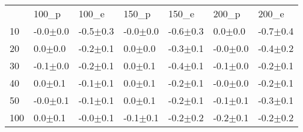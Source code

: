 \begin{tabular}{lllllll}
 & 100_p & 100_e & 150_p & 150_e & 200_p & 200_e \\
10 & {\cellcolor[HTML]{ABABAB}} \color[HTML]{000000} -0.0$\pm$0.0 & {\cellcolor[HTML]{D7D7D7}} \color[HTML]{000000} -0.5$\pm$0.3 & {\cellcolor[HTML]{9C9C9C}} \color[HTML]{F1F1F1} -0.0$\pm$0.0 & {\cellcolor[HTML]{DBDBDB}} \color[HTML]{000000} -0.6$\pm$0.3 & {\cellcolor[HTML]{ADADAD}} \color[HTML]{000000} 0.0$\pm$0.0 & {\cellcolor[HTML]{D2D2D2}} \color[HTML]{000000} -0.7$\pm$0.4 \\
20 & {\cellcolor[HTML]{9F9F9F}} \color[HTML]{F1F1F1} 0.0$\pm$0.0 & {\cellcolor[HTML]{D6D6D6}} \color[HTML]{000000} -0.2$\pm$0.1 & {\cellcolor[HTML]{959595}} \color[HTML]{F1F1F1} 0.0$\pm$0.0 & {\cellcolor[HTML]{F2F2F2}} \color[HTML]{000000} -0.3$\pm$0.1 & {\cellcolor[HTML]{989898}} \color[HTML]{F1F1F1} -0.0$\pm$0.0 & {\cellcolor[HTML]{D7D7D7}} \color[HTML]{000000} -0.4$\pm$0.2 \\
30 & {\cellcolor[HTML]{C4C4C4}} \color[HTML]{000000} -0.1$\pm$0.0 & {\cellcolor[HTML]{D3D3D3}} \color[HTML]{000000} -0.2$\pm$0.1 & {\cellcolor[HTML]{989898}} \color[HTML]{F1F1F1} 0.0$\pm$0.1 & {\cellcolor[HTML]{FFFFFF}} \color[HTML]{000000} -0.4$\pm$0.1 & {\cellcolor[HTML]{CECECE}} \color[HTML]{000000} -0.1$\pm$0.0 & {\cellcolor[HTML]{D1D1D1}} \color[HTML]{000000} -0.2$\pm$0.1 \\
40 & {\cellcolor[HTML]{AAAAAA}} \color[HTML]{F1F1F1} 0.0$\pm$0.1 & {\cellcolor[HTML]{B4B4B4}} \color[HTML]{000000} -0.1$\pm$0.1 & {\cellcolor[HTML]{A2A2A2}} \color[HTML]{F1F1F1} 0.0$\pm$0.1 & {\cellcolor[HTML]{DFDFDF}} \color[HTML]{000000} -0.2$\pm$0.1 & {\cellcolor[HTML]{9C9C9C}} \color[HTML]{F1F1F1} -0.0$\pm$0.0 & {\cellcolor[HTML]{C1C1C1}} \color[HTML]{000000} -0.2$\pm$0.1 \\
50 & {\cellcolor[HTML]{9D9D9D}} \color[HTML]{F1F1F1} -0.0$\pm$0.1 & {\cellcolor[HTML]{BDBDBD}} \color[HTML]{000000} -0.1$\pm$0.1 & {\cellcolor[HTML]{9F9F9F}} \color[HTML]{F1F1F1} 0.0$\pm$0.1 & {\cellcolor[HTML]{D7D7D7}} \color[HTML]{000000} -0.2$\pm$0.1 & {\cellcolor[HTML]{E2E2E2}} \color[HTML]{000000} -0.1$\pm$0.1 & {\cellcolor[HTML]{E1E1E1}} \color[HTML]{000000} -0.3$\pm$0.1 \\
100 & {\cellcolor[HTML]{979797}} \color[HTML]{F1F1F1} 0.0$\pm$0.1 & {\cellcolor[HTML]{989898}} \color[HTML]{F1F1F1} -0.0$\pm$0.1 & {\cellcolor[HTML]{A0A0A0}} \color[HTML]{F1F1F1} -0.1$\pm$0.1 & {\cellcolor[HTML]{C6C6C6}} \color[HTML]{000000} -0.2$\pm$0.2 & {\cellcolor[HTML]{DCDCDC}} \color[HTML]{000000} -0.2$\pm$0.1 & {\cellcolor[HTML]{C9C9C9}} \color[HTML]{000000} -0.2$\pm$0.2 \\

\end{tabular}
